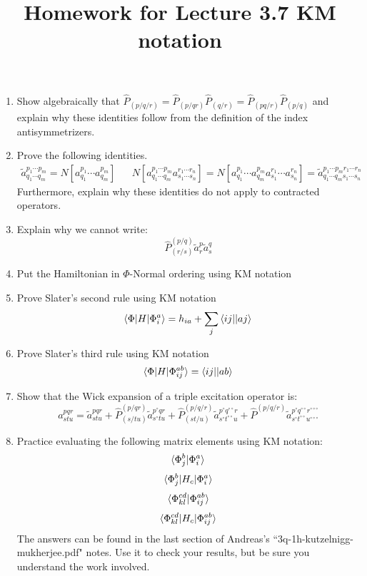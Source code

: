 \documentclass{article}
\title{Homework for Lecture 3.7 KM notation}
\date{}
\newcommand{\hole}{\circ}
\newcommand{\tl}{\tilde}
\newcommand{\cd}{\ensuremath{\cdots} }
\begin{document}
\maketitle
\noindent
\begin{enumerate}
\item
  Show algebraically that $\hat{P}_{(p/q/r)}=\hat{P}_{(p/qr)}\hat{P}_{(q/r)}=\hat{P}_{(pq/r)}\hat{P}_{(p/q)}$ and explain why these identities follow from the definition of the index antisymmetrizers.
\item 
  Prove the following identities.
\begin{align*}
  \tl{a}^{p_1\cd p_m}_{q_1\cd q_m}
=
N[a^{p_1}_{q_1}\cd a^{p_m}_{q_m}]
&&
N[a^{p_1\cd p_m}_{q_1\cd q_m}a^{r_1\cd r_n}_{s_1\cd s_n}]
=
  N[a^{p_1}_{q_1}\cd a^{p_m}_{q_m}a^{r_1}_{s_1}\cd a^{r_n}_{s_n}]
=
  \tl{a}^{p_1\cd p_mr_1\cd r_n}_{q_1\cd q_ms_1\cd s_n}
\end{align*}
Furthermore, explain why these identities do not apply to contracted operators. 
  \item Explain why we cannot write: 
\[\hat{P}^{(p/q)}_{(r/s)} \tl{a}^p_r\tl{a}^q_s \]
\item Put the Hamiltonian in $\Phi$-Normal ordering using KM notation 
\item Prove Slater's second rule using KM notation
\[\braket{\Phi|H|\Phi_i^a} = h_{ia} + \sum_{j} \braket{ij || aj} \]
\item Prove Slater's third rule using KM notation
\[\braket{\Phi|H|\Phi_{ij}^{ab}} = \braket{ij || ab} \]
\item Show that the Wick expansion of a triple excitation operator is: 
\[
  a^{pqr}_{stu}
=
  \tl{a}^{pqr}_{stu}
+
  \hat{P}^{(p/qr)}_{(s/tu)}
  \tl{a}^{p^\hole qr}_{s^\hole tu}
+
  \hat{P}^{(p/q/r)}_{(st/u)}
  \tl{a}^{p^\hole q^{\hole\hole} r}_{s^\hole t^{\hole\hole} u}
+
  \hat{P}^{(p/q/r)}
  \tl{a}^{p^\hole q^{\hole\hole} r^{\hole\hole\hole}}
        _{s^\hole t^{\hole\hole} u^{\hole\hole\hole}}
\]
\item Practice evaluating the following matrix elements using KM notation:
\[ \braket{\Phi_j^b |\Phi_{i}^{a}} \]
\[ \braket{\Phi_j^b |H_c| \Phi_{i}^{a}} \]
\[ \braket{\Phi_{kl}^{cd}|\Phi_{ij}^{ab}} \]
\[ \braket{\Phi_{kl}^{cd}|H_c|\Phi_{ij}^{ab}} \]
The answers can be found in the last section of Andreas's ``3q-1h-kutzelnigg-mukherjee.pdf" notes.
Use it to check your results, but be sure you understand the work involved. 
\end{enumerate}
\end{document}
